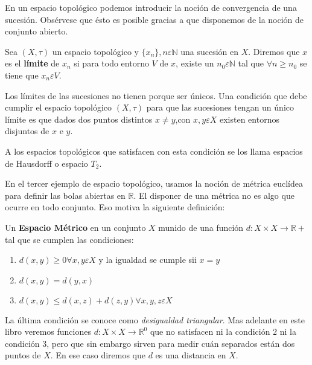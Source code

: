 En un espacio topol\'ogico podemos introducir la noci\'on de convergencia de una sucesi\'on. Obs\'ervese que \'esto es posible gracias a que disponemos de la noci\'on de conjunto abierto.

\begin{definicion}
Sea $(X, \tau)$ un espacio topol\'ogico y $\{x_n\}, n \varepsilon \mathbb{N}$ una sucesi\'on en $X$. Diremos que $x$ es el {\bf l\'imite} de $x_n $ si para todo entorno $V$ de $x$, existe un $n_0 \varepsilon \mathbb{N}$ tal que $\forall n \geq n_0$ se tiene que $x_n \varepsilon V$.
\end{definicion}

Los l\'imites de las sucesiones no tienen porque ser \'unicos. Una condici\'on que debe cumplir el espacio topol\'ogico $(X,\tau)$ para que las sucesiones tengan un \'unico l\'imite es que dados dos puntos distintos $x \neq y$,con $ x,y \varepsilon X$ existen entornos disjuntos de $x$ e $y$.

A los espacios topol\'ogicos que satisfacen con esta condici\'on se los llama espacios de Hausdorff o espacio $T_2$.


En el tercer ejemplo de espacio topol\'ogico, usamos la noci\'on de m\'etrica eucl\'idea para definir las bolas abiertas en $\mathbb{R}$. El disponer de una m\'etrica no es algo que ocurre en todo conjunto. Eso motiva la siguiente definici\'on:

\begin{definicion}
Un {\bf Espacio M\'etrico} en un conjunto $X$ munido de una funci\'on $d: X \times X \rightarrow \mathbb{R}+$ tal que se cumplen las condiciones:
\begin{enumerate}
\item $d(x,y) \geq 0 \forall x,y \varepsilon X$ y la igualdad se cumple sii $x=y$
\item $d(x,y) = d(y,x)$
\item $d(x,y) \leq d(x,z)+d(z,y) \forall x,y,z \varepsilon X$
\end{enumerate}
\end{definicion}
La \'ultima condici\'on se conoce como {\it desigualdad triangular}. Mas adelante en este libro veremos funciones $d: X \times X \rightarrow \mathbb{R}^0$ que no satisfacen ni la condici\'on 2 ni la condici\'on 3, pero que sin embargo sirven para medir cu\'an separados est\'an dos puntos de $X$. En ese caso diremos que $d$ es una distancia en $X$.

